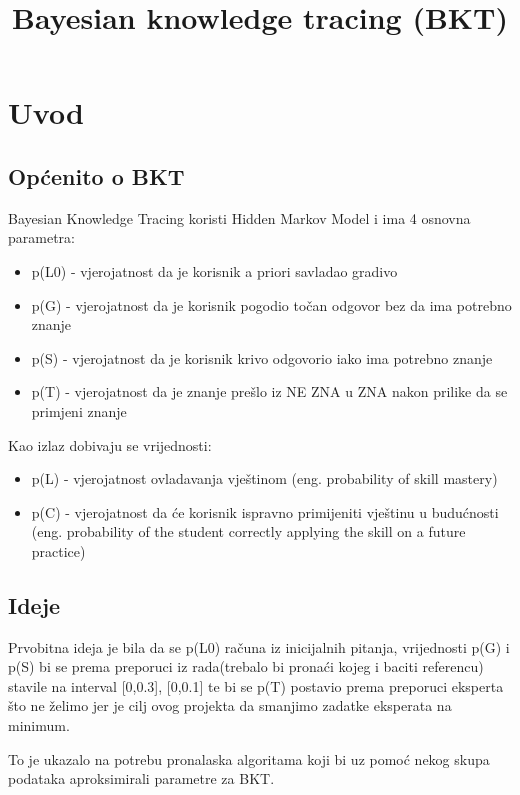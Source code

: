 \documentclass{report}
\begin{document}
	\title{Bayesian knowledge tracing (BKT)}
		
	\maketitle
		
	\chapter{Uvod}
	\section{Općenito o BKT}
		Bayesian Knowledge Tracing koristi Hidden Markov Model i ima 4 osnovna parametra:
		\begin{itemize}
			\item p(L0) - vjerojatnost da je korisnik a priori savladao gradivo
			\item p(G) - vjerojatnost da je korisnik pogodio točan odgovor bez da ima potrebno znanje	
			\item p(S) - vjerojatnost da je korisnik krivo odgovorio iako ima potrebno znanje	
			\item p(T) - vjerojatnost da je znanje prešlo iz NE ZNA u ZNA nakon prilike da se primjeni znanje
		\end{itemize}
		Kao izlaz dobivaju se vrijednosti:
		\begin{itemize}
			\item p(L) - vjerojatnost ovladavanja vještinom (eng. probability of skill mastery)
			\item p(C) - vjerojatnost da će korisnik ispravno primijeniti vještinu u budućnosti (eng. probability of the student correctly applying the skill on a future practice)
		\end{itemize}
	\section{Ideje}
		Prvobitna ideja je bila da se p(L0) računa iz inicijalnih pitanja, vrijednosti p(G) i p(S) bi se prema preporuci iz rada(trebalo bi pronaći kojeg i baciti referencu) stavile na interval [0,0.3], [0,0.1] te bi se p(T) postavio prema preporuci eksperta što ne želimo jer je cilj ovog projekta da smanjimo zadatke eksperata na minimum.
		
		To je ukazalo na potrebu pronalaska algoritama koji bi uz pomoć nekog skupa podataka aproksimirali parametre za BKT.
\end{document}
